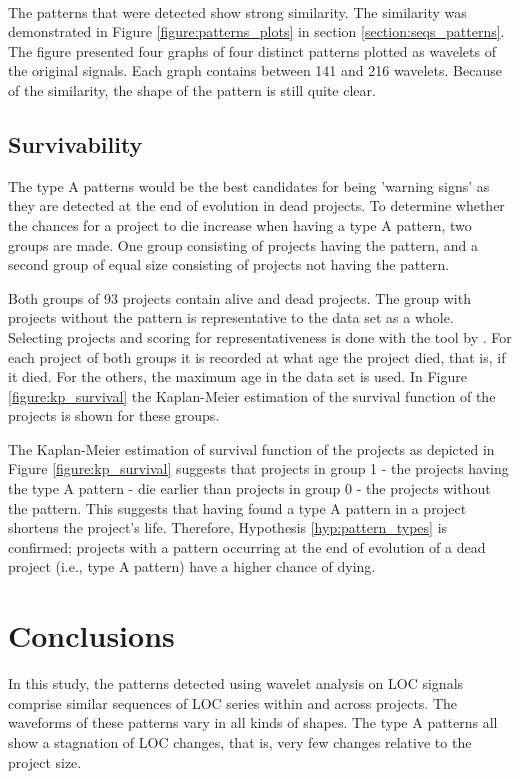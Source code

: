 \paragraph{}
The patterns that were detected show strong similarity. The similarity was
demonstrated in Figure \ref{figure:patterns_plots} in section
\ref{section:seqs_patterns}. The figure presented four graphs of four distinct
patterns plotted as wavelets of the original signals. Each graph contains
between 141 and 216 wavelets. Because of the similarity, the shape of the
pattern is still quite clear.

\subsection{Survivability}
\label{section:kp_survival}
The type A patterns would be the best candidates for being 'warning signs' as
they are detected at the end of evolution in dead projects. To determine whether
the chances for a project to die increase when having a type A pattern, two
groups are made. One group consisting of projects having the pattern, and
a second group of equal size consisting of projects not having the pattern.

Both groups of 93 projects contain alive and dead projects. The group with
projects without the pattern is representative to the data set as a whole.
Selecting projects and scoring for representativeness is done with the tool by
\citet{nagappan}. For each project of both groups it is recorded at what age
the project died, that is, if it died. For the others, the maximum age in the
data set is used. In Figure \ref{figure:kp_survival} the Kaplan-Meier
estimation of the survival function of the projects is shown for these groups.



\noindent
The Kaplan-Meier estimation of survival function of the projects as depicted in
Figure \ref{figure:kp_survival} suggests that projects in group 1 - the
projects having the type A pattern - die earlier than projects in group 0 - the
projects without the pattern. This suggests that having found a type A pattern
in a project shortens the project's life. Therefore, Hypothesis
\ref{hyp:pattern_types} is confirmed; projects with a pattern occurring at the
end of evolution of a dead project (i.e., type A pattern) have a higher chance
of dying.

\section{Conclusions}
\label{section:conclusions}
In this study, the patterns detected using wavelet analysis on LOC signals
comprise similar sequences of LOC series within and across projects. The
waveforms of these patterns vary in all kinds of shapes. The type A patterns
all show a stagnation of LOC changes, that is, very few changes relative to the
project size.


